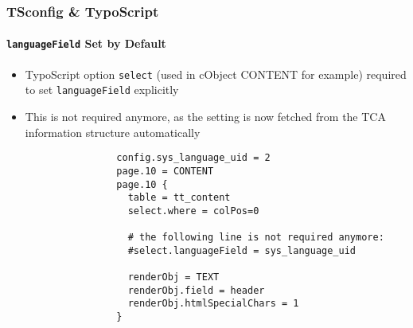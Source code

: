 \begin{frame}[fragile]
	\frametitle{TSconfig \& TypoScript}
	\framesubtitle{\texttt{languageField} Set by Default}

	\lstset{basicstyle=\tiny\ttfamily}

	\begin{itemize}

		\item TypoScript option \texttt{select} (used in cObject CONTENT for example) required to set
			\texttt{languageField} explicitly

		\item This is not required anymore, as the setting is now fetched from the TCA information structure automatically


			\begin{lstlisting}
				config.sys_language_uid = 2
				page.10 = CONTENT
				page.10 {
				  table = tt_content
				  select.where = colPos=0

				  # the following line is not required anymore:
				  #select.languageField = sys_language_uid

				  renderObj = TEXT
				  renderObj.field = header
				  renderObj.htmlSpecialChars = 1
				}
			\end{lstlisting}

	\end{itemize}

\end{frame}

